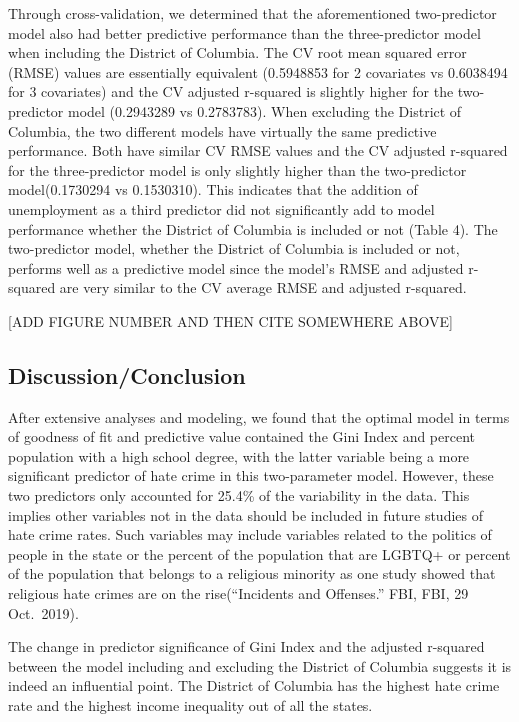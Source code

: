 \documentclass[
]{article}
\begin{document}
Through cross-validation, we determined that the aforementioned
two-predictor model also had better predictive performance than the
three-predictor model when including the District of Columbia. The CV
root mean squared error (RMSE) values are essentially equivalent
(0.5948853 for 2 covariates vs 0.6038494 for 3 covariates) and the CV
adjusted r-squared is slightly higher for the two-predictor model
(0.2943289 vs 0.2783783). When excluding the District of Columbia, the
two different models have virtually the same predictive performance.
Both have similar CV RMSE values and the CV adjusted r-squared for the
three-predictor model is only slightly higher than the two-predictor
model(0.1730294 vs 0.1530310). This indicates that the addition of
unemployment as a third predictor did not significantly add to model
performance whether the District of Columbia is included or not (Table
4). The two-predictor model, whether the District of Columbia is
included or not, performs well as a predictive model since the model's
RMSE and adjusted r-squared are very similar to the CV average RMSE and
adjusted r-squared.

{[}ADD FIGURE NUMBER AND THEN CITE SOMEWHERE ABOVE{]}

\hypertarget{discussionconclusion}{%
\subsection{Discussion/Conclusion}\label{discussionconclusion}}

After extensive analyses and modeling, we found that the optimal model
in terms of goodness of fit and predictive value contained the Gini
Index and percent population with a high school degree, with the latter
variable being a more significant predictor of hate crime in this
two-parameter model. However, these two predictors only accounted for
25.4\% of the variability in the data. This implies other variables not
in the data should be included in future studies of hate crime rates.
Such variables may include variables related to the politics of people
in the state or the percent of the population that are LGBTQ+ or percent
of the population that belongs to a religious minority as one study
showed that religious hate crimes are on the rise(``Incidents and
Offenses.'' FBI, FBI, 29 Oct.~2019).

The change in predictor significance of Gini Index and the adjusted
r-squared between the model including and excluding the District of
Columbia suggests it is indeed an influential point. The District of
Columbia has the highest hate crime rate and the highest income
inequality out of all the states.
\end{document}
